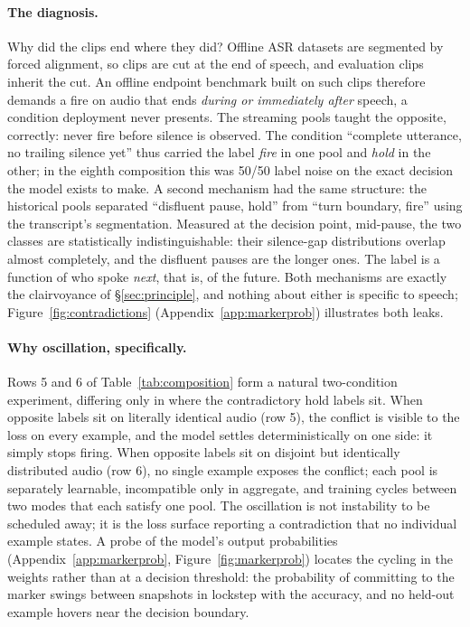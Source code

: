 \documentclass[11pt]{article}
\begin{document}
\paragraph{The diagnosis.} Why did the clips end where they did? Offline ASR datasets are segmented by forced alignment, so clips are cut at the end of speech, and evaluation clips inherit the cut. An offline endpoint benchmark built on such clips therefore demands a fire on audio that ends \emph{during or immediately after} speech, a condition deployment never presents. The streaming pools taught the opposite, correctly: never fire before silence is observed. The condition ``complete utterance, no trailing silence yet'' thus carried the label \emph{fire} in one pool and \emph{hold} in the other; in the eighth composition this was 50/50 label noise on the exact decision the model exists to make. A second mechanism had the same structure: the historical pools separated ``disfluent pause, hold'' from ``turn boundary, fire'' using the transcript's segmentation. Measured at the decision point, mid-pause, the two classes are statistically indistinguishable: their silence-gap distributions overlap almost completely, and the disfluent pauses are the longer ones. The label is a function of who spoke \emph{next}, that is, of the future. Both mechanisms are exactly the clairvoyance of \S\ref{sec:principle}, and nothing about either is specific to speech; Figure~\ref{fig:contradictions} (Appendix~\ref{app:markerprob}) illustrates both leaks.

\paragraph{Why oscillation, specifically.} Rows 5 and 6 of Table~\ref{tab:composition} form a natural two-condition experiment, differing only in where the contradictory hold labels sit. When opposite labels sit on literally identical audio (row 5), the conflict is visible to the loss on every example, and the model settles deterministically on one side: it simply stops firing. When opposite labels sit on disjoint but identically distributed audio (row 6), no single example exposes the conflict; each pool is separately learnable, incompatible only in aggregate, and training cycles between two modes that each satisfy one pool. The oscillation is not instability to be scheduled away; it is the loss surface reporting a contradiction that no individual example states. A probe of the model's output probabilities (Appendix~\ref{app:markerprob}, Figure~\ref{fig:markerprob}) locates the cycling in the weights rather than at a decision threshold: the probability of committing to the marker swings between snapshots in lockstep with the accuracy, and no held-out example hovers near the decision boundary.
\end{document}
